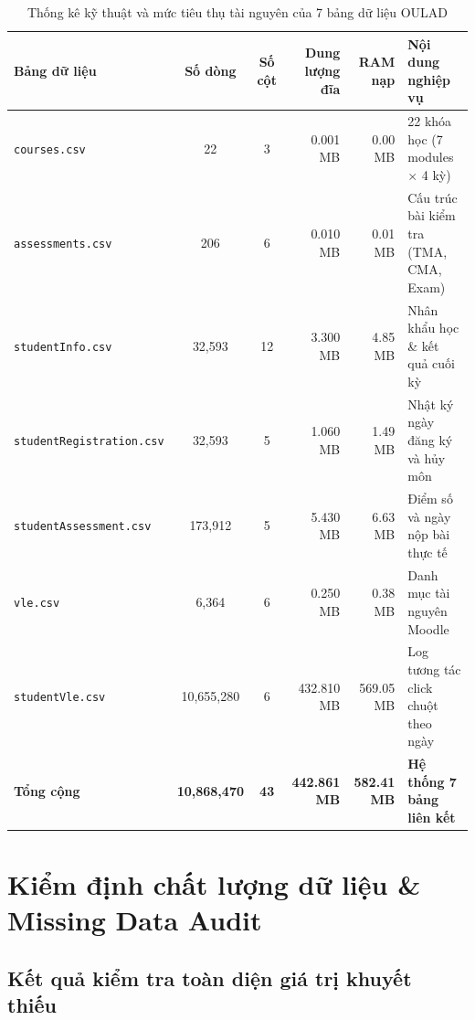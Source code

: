 \documentclass[11pt,a4paper]{article}
\begin{document}
\begin{table}[H]
\centering
\small
\renewcommand{\arraystretch}{1.25}
\begin{tabularx}{\textwidth}{@{}l c c r r X@{}}
\toprule
\textbf{Bảng dữ liệu} & \textbf{Số dòng} & \textbf{Số cột} & \textbf{Dung lượng đĩa} & \textbf{RAM nạp} & \textbf{Nội dung nghiệp vụ} \\
\midrule
\texttt{courses.csv} & 22 & 3 & 0.001 MB & 0.00 MB & 22 khóa học (7 modules $\times$ 4 kỳ) \\
\texttt{assessments.csv} & 206 & 6 & 0.010 MB & 0.01 MB & Cấu trúc bài kiểm tra (TMA, CMA, Exam) \\
\texttt{studentInfo.csv} & 32,593 & 12 & 3.300 MB & 4.85 MB & Nhân khẩu học \& kết quả cuối kỳ \\
\texttt{studentRegistration.csv} & 32,593 & 5 & 1.060 MB & 1.49 MB & Nhật ký ngày đăng ký và hủy môn \\
\texttt{studentAssessment.csv} & 173,912 & 5 & 5.430 MB & 6.63 MB & Điểm số và ngày nộp bài thực tế \\
\texttt{vle.csv} & 6,364 & 6 & 0.250 MB & 0.38 MB & Danh mục tài nguyên Moodle \\
\texttt{studentVle.csv} & 10,655,280 & 6 & 432.810 MB & 569.05 MB & Log tương tác click chuột theo ngày \\
\midrule
\textbf{Tổng cộng} & \textbf{10,868,470} & \textbf{43} & \textbf{442.861 MB} & \textbf{582.41 MB} & \textbf{Hệ thống 7 bảng liên kết} \\
\bottomrule
\end{tabularx}
\caption{Thống kê kỹ thuật và mức tiêu thụ tài nguyên của 7 bảng dữ liệu OULAD}
\end{table}

\newpage

\section{Kiểm định chất lượng dữ liệu \& Missing Data Audit}

\subsection{Kết quả kiểm tra toàn diện giá trị khuyết thiếu}
\end{document}
